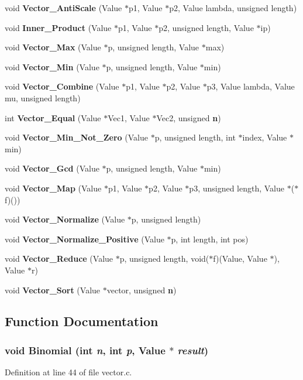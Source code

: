 \begin{CompactItemize}
void {\bf Vector\_\-Anti\-Scale} (Value $\ast$p1, Value $\ast$p2, Value lambda, unsigned length)
\item 
void {\bf Inner\_\-Product} (Value $\ast$p1, Value $\ast$p2, unsigned length, Value $\ast$ip)
\item 
void {\bf Vector\_\-Max} (Value $\ast$p, unsigned length, Value $\ast$max)
\item 
void {\bf Vector\_\-Min} (Value $\ast$p, unsigned length, Value $\ast$min)
\item 
void {\bf Vector\_\-Combine} (Value $\ast$p1, Value $\ast$p2, Value $\ast$p3, Value lambda, Value mu, unsigned length)
\item 
int {\bf Vector\_\-Equal} (Value $\ast$Vec1, Value $\ast$Vec2, unsigned {\bf n})
\item 
void {\bf Vector\_\-Min\_\-Not\_\-Zero} (Value $\ast$p, unsigned length, int $\ast$index, Value $\ast$min)
\item 
void {\bf Vector\_\-Gcd} (Value $\ast$p, unsigned length, Value $\ast$min)
\item 
void {\bf Vector\_\-Map} (Value $\ast$p1, Value $\ast$p2, Value $\ast$p3, unsigned length, Value $\ast$($\ast$f)())
\item 
void {\bf Vector\_\-Normalize} (Value $\ast$p, unsigned length)
\item 
void {\bf Vector\_\-Normalize\_\-Positive} (Value $\ast$p, int length, int pos)
\item 
void {\bf Vector\_\-Reduce} (Value $\ast$p, unsigned length, void($\ast$f)(Value, Value $\ast$), Value $\ast$r)
\item 
void {\bf Vector\_\-Sort} (Value $\ast$vector, unsigned {\bf n})
\end{CompactItemize}


\subsection{Function Documentation}
\subsubsection{\setlength{\rightskip}{0pt plus 5cm}void Binomial (int {\em n}, int {\em p}, Value $\ast$ {\em result})}\label{vector_8c_a1}




Definition at line 44 of file vector.c.
